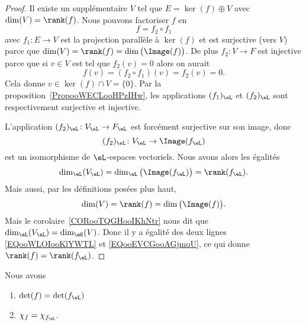 \begin{proof}
	Il existe un supplémentaire \( V\) tel que \( E=\ker(f)\oplus V\) avec \( \dim(V)=\rank(f)\). Nous pouvons factoriser \( f\) en
	\begin{equation}
		f=f_2\circ f_1
	\end{equation}
	avec \( f_1\colon E\to V\) est la projection parallèle à \( \ker(f)\) et est surjective (vers \( V\)) parce que \( \dim(V)=\rank(f)=\dim\big( \Image(f) \big)\). De plus \( f_2\colon V\to F\) est injective parce que si \( v\in V\) est tel que \( f_2(v)=0\) alors on aurait
	\begin{equation}
		f(v)=(f_2\circ f_1)(v)=f_2(v)=0.
	\end{equation}
	Cela donne \( v\in\ker(f)\cap V=\{ 0 \}\). Par la proposition~\ref{PropooWECLooHPzIHw}, les applications \( (f_1)_{\eL}\) et \( (f_2)_{\eL}\) sont respectivement surjective et injective.

	L'application \( (f_2)_{\eL}\colon V_{\eL}\to F_{\eL}\) est forcément surjective sur son image, donc
	\begin{equation}
		(f_2)_{\eL}\colon V_{\eL}\to \Image(f_{\eL})
	\end{equation}
	est un isomorphisme de \( \eL\)-espaces vectoriels. Nous avons alors les égalités
	\begin{equation}        \label{EQooWLOIooKlYWTL}
		\dim_{\eL}(V_{\eL})=\dim_{\eL}\big( \Image(f_{\eL}) \big)=\rank(f_{\eL}).
	\end{equation}
	Mais aussi, par les définitions posées plus haut,
	\begin{equation}        \label{EQooEVCGooAGjmoU}
		\dim(V)=\rank(f)=\dim\big( \Image(f) \big).
	\end{equation}
	Mais le corolaire~\ref{CORooTQGHooIKhNtr} nous dit que \( \dim_{\eL}(V_{\eL})=\dim_{\eK}(V)\). Donc il y a égalité des deux lignes \eqref{EQooWLOIooKlYWTL} et \eqref{EQooEVCGooAGjmoU}, ce qui donne \( \rank(f)=\rank(f_{\eL})\).
\end{proof}

\begin{proposition}     \label{PROPooZAZFooUFdCUv}
	Nous avons
	\begin{enumerate}
		\item
		      \( \det(f)=\det(f_{\eL})\)
		\item
		      \( \chi_f=\chi_{f_{\eL}}\).
	\end{enumerate}
\end{proposition}


